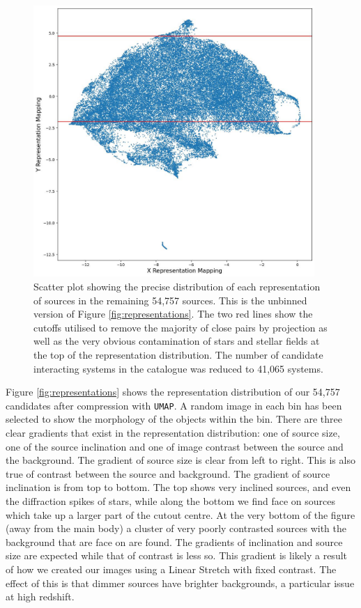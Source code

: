 {\begin{figure}
  \centering
  \includegraphics[width=0.95\textwidth]{Chapter2/figures/fig8.jpeg}
  \caption[Scatter plot showing the precise distribution of each representation of sources in the remaining 54,757 sources.]{Scatter plot showing the precise distribution of each representation of sources in the remaining 54,757 sources. This is the unbinned version of Figure \ref{fig:representations}. The two red lines show the cutoffs utilised to remove the majority of close pairs by projection as well as the very obvious contamination of stars and stellar fields at the top of the representation distribution. The number of candidate interacting systems in the catalogue was reduced to 41,065 systems.}
  \label{fig:cuts-visual}
\end{figure}

Figure \ref{fig:representations} shows the representation distribution of our 54,757 candidates after compression with \texttt{UMAP}. A random image in each bin has been selected to show the morphology of the objects within the bin. There are three clear gradients that exist in the representation distribution: one of source size, one of the source inclination and one of image contrast between the source and the background. The gradient of source size is clear from left to right. This is also true of contrast between the source and background. The gradient of source inclination is from top to bottom. The top shows very inclined sources, and even the diffraction spikes of stars, while along the bottom we find face on sources which take up a larger part of the cutout centre. At the very bottom of the figure (away from the main body) a cluster of very poorly contrasted sources with the background that are face on are found. The gradients of inclination and source size are expected while that of contrast is less so. This gradient is likely a result of how we created our images using a Linear Stretch with fixed contrast. The effect of this is that dimmer sources have brighter backgrounds, a particular issue at high redshift.

}
